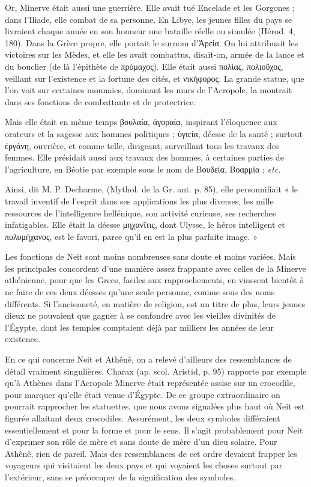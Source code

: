 \documentclass[letterpaper,twocolumn,openany,nodeprecatedcode]{dndbook}
\begin{document}
Or, Minerve était aussi une guerrière. Elle avait tué Encelade et les Gorgones ; dans l'Iliade, elle combat de sa personne. En Libye, les jeunes filles du pays se livraient chaque année en son honneur une bataille réelle ou simulée (Hérod. 4, 180). Dans la Grèce propre, elle portait le surnom d'Ἀρεία. On lui attribuait les victoires sur les Mèdes, et elle les avait combattus, disait-on, armée de la lance et du bouclier (de là l'épithète de πρόμαχος). Elle était aussi πολίας, πολιοῦχος, veillant sur l'existence et la fortune des cités, et νικήφορος. La grande statue, que l'on voit sur certaines monnaies, dominant les murs de l'Acropole, la montrait dans ses fonctions de combattante et de protectrice.

Mais elle était en même temps βουλαία, ἀγοραία, inspirant l'éloquence aux orateurs et la sagesse aux hommes politiques ; ὑγιεία, déesse de la santé ; surtout ἐργάνη, ouvrière, et comme telle, dirigeant, surveillant tous les travaux des femmes. Elle présidait aussi aux travaux des hommes, à certaines parties de l'agriculture, en Béotie par exemple sous le nom de Βουδεία, Βοαρμία ; \emph{etc.}

Ainsi, dit M. P. Decharme, (Mythol. de la Gr. ant. p. 85), elle personnifiait « le travail inventif de l'esprit dans ses applications les plus diverses, les mille ressources de l'intelligence hellénique, son activité curieuse, ses recherches infatigables. Elle était la déesse μηχανῖτις, dont Ulysse, le héros intelligent et πολυμήχανος, est le favori, parce qu’il en est la plus parfaite image. »

Les fonctions de Neit sont moins nombreuses sans doute et moins variées. Mais les principales concordent d'une manière assez frappante avec celles de la Minerve athénienne, pour que les Grecs, faciles aux rapprochements, en vinssent bientôt à ne faire de ces deux déesses qu'une seule personne, connue sous des noms différents. Si l'ancienneté, en matière de religion, est un titre de plus, leurs jeunes dieux ne pouvaient que gagner à se confondre avec les vieilles divinités de l'Égypte, dont les temples comptaient déjà par milliers les années de leur existence.

En ce qui concerne Neit et Athênê, on a relevé d'ailleurs des ressemblances de détail vraiment singulières. Charax (ap. scol. Aristid, p. 95) rapporte par exemple qu'à Athènes dans l'Acropole Minerve était représentée assise sur un crocodile, pour marquer qu'elle était venue d'Égypte. De ce groupe extraordinaire on pourrait rapprocher les statuettes, que nous avons signalées plus haut où Neit est figurée allaitant deux crocodiles. Assurément, les deux symboles différaient essentiellement et pour la forme et pour le sens. Il s'agit probablement pour Neit d'exprimer son rôle de mère et sans doute de mère d'un dieu solaire. Pour Athênê, rien de pareil. Mais des ressemblances de cet ordre devaient frapper les voyageurs qui visitaient les deux pays et qui voyaient les choses surtout par l'extérieur, sans se préoccuper de la signification des symboles.
\end{document}
